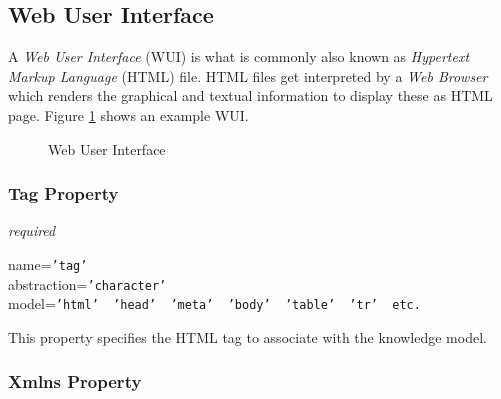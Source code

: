 %
%
%
%
%
%

\subsection{Web User Interface}
\label{web_user_interface_heading}

A \emph{Web User Interface} (WUI) is what is commonly also known as
\emph{Hypertext Markup Language} (HTML) file. HTML files get interpreted by a
\emph{Web Browser} which renders the graphical and textual information to
display these as HTML page. Figure \ref{web_user_interface_figure} shows an
example WUI.

\begin{figure}[ht]
    \begin{center}
        \caption{Web User Interface}
        \label{web_user_interface_figure}
    \end{center}
\end{figure}

\subsubsection{Tag Property}

\emph{required}

name=\texttt{'tag'}\\
abstraction=\texttt{'character'}\\
model=\texttt{'html' \vline\ 'head' \vline\ 'meta' \vline\ 'body' \vline\ 'table' \vline\ 'tr' \vline\ etc.}

This property specifies the HTML tag to associate with the knowledge model.

\subsubsection{Xmlns Property}

